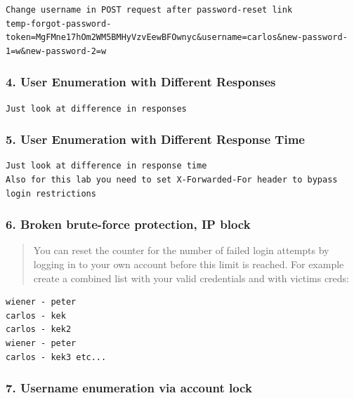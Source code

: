 \documentclass[
  letterpaper,
]{article}
\begin{document}
\begin{Verbatim}[breaklines,breakanywhere,fontsize=\small]
Change username in POST request after password-reset link
temp-forgot-password-token=MgFMne17hOm2WM5BMHyVzvEewBFOwnyc&username=carlos&new-password-1=w&new-password-2=w
\end{Verbatim}

\subsubsection{4. User Enumeration with Different
Responses}\label{4-user-enumeration-with-different-responses}

\begin{Verbatim}[breaklines,breakanywhere,fontsize=\small]
Just look at difference in responses
\end{Verbatim}

\subsubsection{5. User Enumeration with Different Response
Time}\label{5-user-enumeration-with-different-response-time}

\begin{Verbatim}[breaklines,breakanywhere,fontsize=\small]
Just look at difference in response time
Also for this lab you need to set X-Forwarded-For header to bypass login restrictions
\end{Verbatim}

\subsubsection{6. Broken brute-force protection, IP
block}\label{6-broken-brute-force-protection-ip-block}

\begin{quote}
You can reset the counter for the number of failed login attempts by
logging in to your own account before this limit is reached. For example
create a combined list with your valid credentials and with
victim\textquotesingle s creds:
\end{quote}

\begin{Verbatim}[breaklines,breakanywhere,fontsize=\small]
wiener - peter
carlos - kek
carlos - kek2
wiener - peter
carlos - kek3 etc...
\end{Verbatim}

\subsubsection{7. Username enumeration via account
lock}\label{7-username-enumeration-via-account-lock}
\end{document}
